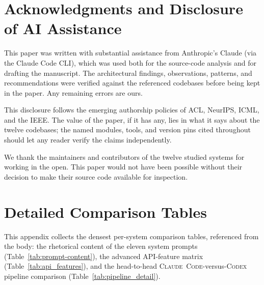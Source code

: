 \documentclass[11pt,a4paper]{article}
\newcommand{\clcode}{\textsc{Claude~Code}\xspace}
\newcommand{\cdx}{\textsc{Codex}\xspace}
\begin{document}
\section*{Acknowledgments and Disclosure of AI Assistance}

This paper was written with substantial assistance from Anthropic's Claude (via the Claude Code CLI), which was used both for the source-code analysis and for drafting the manuscript.
The architectural findings, observations, patterns, and recommendations were verified against the referenced codebases before being kept in the paper.
Any remaining errors are ours.

This disclosure follows the emerging authorship policies of ACL, NeurIPS, ICML, and the IEEE.
The value of the paper, if it has any, lies in what it says about the twelve codebases; the named modules, tools, and version pins cited throughout should let any reader verify the claims independently.

We thank the maintainers and contributors of the twelve studied systems for working in the open.
This paper would not have been possible without their decision to make their source code available for inspection.

\vspace{0.5em}


\appendix
\section{Detailed Comparison Tables}
\label{app:tables}

This appendix collects the densest per-system comparison tables, referenced from the body: the rhetorical content of the eleven system prompts (Table~\ref{tab:prompt-content}), the advanced API-feature matrix (Table~\ref{tab:api_features}), and the head-to-head \clcode{}-versus-\cdx{} pipeline comparison (Table~\ref{tab:pipeline_detail}).
\end{document}
